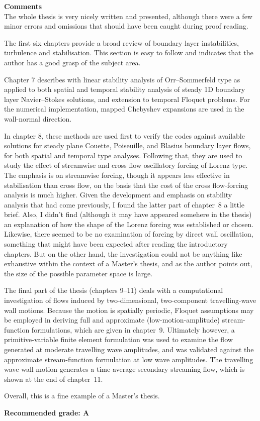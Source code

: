 \documentclass[12pt,a4paper]{letter}
\begin{document}
\noindent\textbf{Comments}\\[5pt] The whole thesis is very nicely
written and presented, although there were a few minor errors and
omissions that should have been caught during proof reading.

The first six chapters provide a broad review of boundary layer
instabilities, turbulence and stabilisation. This section is easy to
follow and indicates that the author has a good grasp of the subject area.

Chapter 7 describes with linear stability analysis of Orr--Sommerfeld
type as applied to both spatial and temporal stability analysis of
steady 1D boundary layer Navier--Stokes solutions, and extension to
temporal Floquet problems. For the numerical implementation, mapped
Chebyshev expansions are used in the wall-normal direction.

In chapter 8, these methods are used first to verify the codes against
available solutions for steady plane Couette, Poiseuille, and Blasius
boundary layer flows, for both spatial and temporal type
analyses. Following that, they are used to study the effect of
streamwise and cross flow oscillatory forcing of Lorenz type. The
emphasis is on streamwise forcing, though it appears less effective in
stabilisation than cross flow, on the basis that the cost of the cross
flow-forcing analysis is much higher. Given the development and
emphasis on stability analysis that had come previously, I found the
latter part of chapter~8 a little brief. Also, I didn't find (although
it may have appeared somehere in the thesis) an explanation of how the
shape of the Lorenz forcing was established or chosen. Likewise, there
seemed to be no examination of forcing by direct wall oscillation,
something that might have been expected after reading the introductory
chapters. But on the other hand, the investigation could not be
anything like exhaustive within the context of a Master's thesis, and
as the author points out, the size of the possible parameter space is
large.

The final part of the thesis (chapters 9--11) deals with a
computational investigation of flows induced by two-dimensional,
two-component travelling-wave wall motions. Because the motion is
spatially periodic, Floquet assumptions may be employed in deriving
full and approximate (low-motion-amplitude) stream-function
formulations, which are given in chapter~9. Ultimately however, a
primitive-variable finite element formulation was used to examine the
flow generated at moderate travelling wave amplitudes, and was
validated against the approximate stream-function formulation at low
wave amplitudes. The travelling wave wall motion generates a
time-average secondary streaming flow, which is shown at the end of
chapter~11.

Overall, this is a fine example of a Master's thesis.

\noindent\textbf{Recommended grade: A}\\[5pt]
\end{document}

